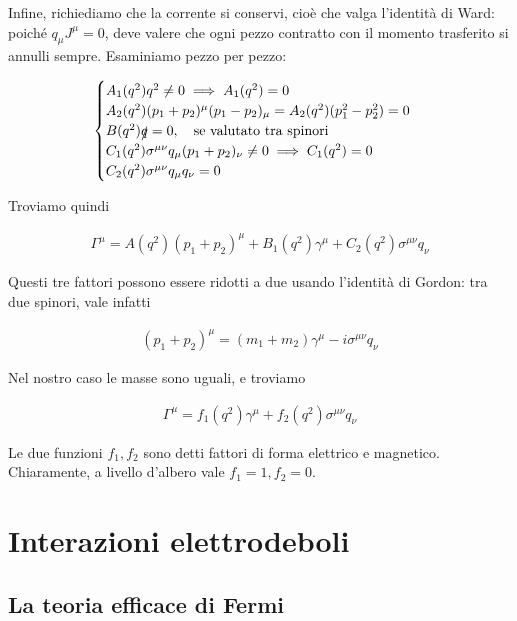 \documentclass[11pt]{report}
\begin{document}
Infine, richiediamo che la corrente si conservi, cioè che valga l'identità di Ward: poiché \(q_\mu J^\mu = 0\), deve valere che ogni pezzo contratto con il momento trasferito si annulli sempre. Esaminiamo pezzo per pezzo: 

\begin{align}
    \begin{cases}
        A_1(q^2) q^2 \neq 0 \implies A_1(q^2) = 0 \\
        A_2(q^2)(p_1+p_2)^\mu(p_1-p_2)_\mu = A_2(q^2)(p_1^2-p_2^2) = 0 \\
        B(q^2)\slashed{q} = 0, \quad \text{se valutato tra spinori} \\ 
        C_1(q^2)\sigma^{\mu\nu}q_\mu (p_1+p_2)_\nu \neq 0 \implies C_1(q^2) = 0 \\
        C_2(q^2)\sigma^{\mu\nu}q_\mu q_\nu = 0 
    \end{cases}
\end{align}

Troviamo quindi 

\begin{align}
    \Gamma^\mu = A(q^2)(p_1+p_2)^\mu + B_1(q^2)\gamma^\mu + C_2(q^2)\sigma^{\mu\nu}q_\nu
\end{align}

Questi tre fattori possono essere ridotti a due usando l'identità di Gordon: tra due spinori, vale infatti 

\begin{align}
    (p_1+p_2)^\mu = (m_1+m_2)\gamma^\mu - i\sigma^{\mu\nu}q_\nu
\end{align}

Nel nostro caso le masse sono uguali, e troviamo 

\begin{align}
    \Gamma^\mu = f_1(q^2)\gamma^\mu + f_2(q^2)\sigma^{\mu\nu}q_\nu
\end{align}

Le due funzioni \(f_1, f_2\) sono detti fattori di forma elettrico e magnetico. Chiaramente, a livello d'albero vale \(f_1 = 1, f_2 = 0\). 

\chapter{Interazioni elettrodeboli}

\section{La teoria efficace di Fermi}
\end{document}
